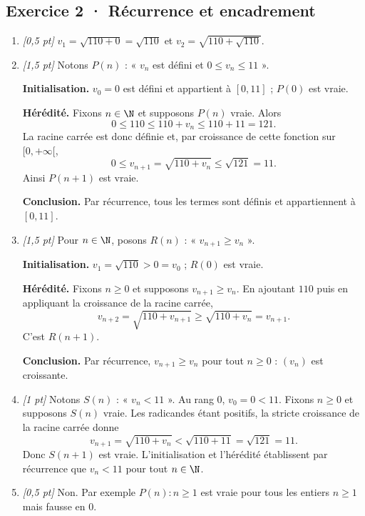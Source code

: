 \subsection*{Exercice 2 · Récurrence et encadrement}\begin{enumerate}

\item \textit{[0,5 pt]} $v_1=\sqrt{110+0}=\sqrt{110}$ et $v_2=\sqrt{110+\sqrt{110}}$.

\item \textit{[1,5 pt]} Notons $P(n)$ : « $v_n$ est défini et $0\le v_n\le 11$ ».
\par\smallskip\textbf{Initialisation.} $v_0=0$ est défini et appartient à $[0,11]$ ; $P(0)$ est vraie.
\par\smallskip\textbf{Hérédité.} Fixons $n\in\N$ et supposons $P(n)$ vraie. Alors
\[0\le 110\le 110+v_n\le 110+11=121.\]
La racine carrée est donc définie et, par croissance de cette fonction sur $[0,+\infty[$,
\[0\le v_{n+1}=\sqrt{110+v_n}\le\sqrt{121}=11.\]
Ainsi $P(n+1)$ est vraie.
\par\smallskip\textbf{Conclusion.} Par récurrence, tous les termes sont définis et appartiennent à $[0,11]$.

\item \textit{[1,5 pt]} Pour $n\in\N$, posons $R(n)$ : « $v_{n+1}\ge v_n$ ».
\par\smallskip\textbf{Initialisation.} $v_1=\sqrt{110}>0=v_0$ ; $R(0)$ est vraie.
\par\smallskip\textbf{Hérédité.} Fixons $n\ge0$ et supposons $v_{n+1}\ge v_n$. En ajoutant $110$ puis en appliquant la croissance de la racine carrée,
\[v_{n+2}=\sqrt{110+v_{n+1}}\ge\sqrt{110+v_n}=v_{n+1}.\]
C'est $R(n+1)$.
\par\smallskip\textbf{Conclusion.} Par récurrence, $v_{n+1}\ge v_n$ pour tout $n\ge0$ : $(v_n)$ est croissante.

\item \textit{[1 pt]} Notons $S(n)$ : « $v_n<11$ ». Au rang $0$, $v_0=0<11$.
Fixons $n\ge0$ et supposons $S(n)$ vraie. Les radicandes étant positifs, la stricte croissance de la racine carrée donne
\[v_{n+1}=\sqrt{110+v_n}<\sqrt{110+11}=\sqrt{121}=11.\]
Donc $S(n+1)$ est vraie. L'initialisation et l'hérédité établissent par récurrence que $v_n<11$ pour tout $n\in\N$.

\item \textit{[0,5 pt]} Non. Par exemple $P(n):n\ge1$ est vraie pour tous les entiers $n\ge1$ mais fausse en $0$.

\end{enumerate}

